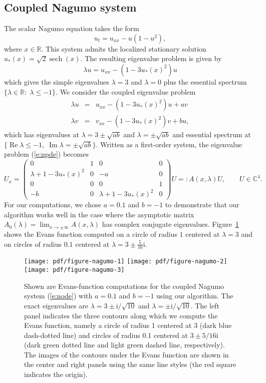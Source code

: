 \documentclass[10pt]{article}
\numberwithin{equation}{section}
\def\Re{\mathop\mathrm{Re}\nolimits}
\def\Im{\mathop\mathrm{Im}\nolimits}
\def\sech{\mathop\mathrm{sech}\nolimits}
\newcommand{\C}{\mathbb{C}}
\newcommand{\R}{\mathbb{R}}
\newcommand{\rmi}{\mathrm{i}}
\begin{document}

\subsection{Coupled Nagumo system}\label{s:cn}

The scalar Nagumo equation takes the form
\[
u_t = u_{xx} - u (1-u^2),
\]
where $x\in\R$. This system admits the localized stationary solution $u_*(x)=\sqrt{2}\sech(x)$. The resulting eigenvalue problem is given by
\[
\lambda u = u_{xx} - (1-3u_*(x)^2) u
\]
which gives the simple eigenvalues $\lambda=3$ and $\lambda=0$ plus the essential spectrum $\{\lambda\in\R:\;\lambda\leq-1\}$. We consider the coupled eigenvalue problem
\begin{eqnarray}
\lambda u & = & u_{xx} - (1-3u_*(x)^2) u + a v \label{e:npde} \\ \nonumber
\lambda v & = & v_{xx} - (1-3u_*(x)^2) v + b u,
\end{eqnarray}
which has eigenvalues at $\lambda=3\pm\sqrt{ab}$ and $\lambda=\pm\sqrt{ab}$ and essential spectrum at $\{\Re\lambda\leq-1, \; \Im\lambda=\pm\sqrt{ab}\}$. Written as a first-order system, the eigenvalue problem (\ref{e:npde}) becomes
\begin{equation}\label{e:node}
U_x = \begin{pmatrix} 0 & 1 & 0 & 0 \\ \lambda+1-3u_*(x)^2 & 0 & -a & 0\\
0 & 0 & 0 & 1 \\ -b & 0 & \lambda+1-3u_*(x)^2 & 0 \end{pmatrix} U
=: A(x,\lambda) U, \qquad U\in\C^4.
\end{equation}
For our computations, we chose $a=0.1$ and $b=-1$ to demonstrate that our algorithm works well in the case where the asymptotic matrix $A_0(\lambda)=\lim_{x\to\pm\infty}A(x,\lambda)$ has complex conjugate eigenvalues. Figure~\ref{f:n1} shows the Evans function computed on a circle of radius $1$ centered at $\lambda=3$ and on circles of radius $0.1$ centered at $\lambda=3\pm\frac{5}{16}\rmi$.

\begin{figure}
\centering
\texttt{[image: pdf/figure-nagumo-1]} \qquad
\texttt{[image: pdf/figure-nagumo-2]} \qquad
\texttt{[image: pdf/figure-nagumo-3]} 
\caption{Shown are Evans-function computations for the coupled Nagumo system (\ref{e:node}) with $a=0.1$ and $b=-1$ using our algorithm. The exact eigenvalues are $\lambda=3\pm\rmi/\sqrt{10}$ and $\lambda=\pm\rmi/\sqrt{10}$. The left panel indicates the three contours along which we compute the Evans function, namely a circle of radius 1 centered at 3 (dark blue dash-dotted line) and circles of radius 0.1 centered at $3\pm5/16\rmi$ (dark green dotted line and light green dashed line, respectively). The images of the contours under the Evans function are shown in the center and right panels using the same line styles (the red square indicates the origin).}
\label{f:n1}
\end{figure}
\end{document}
